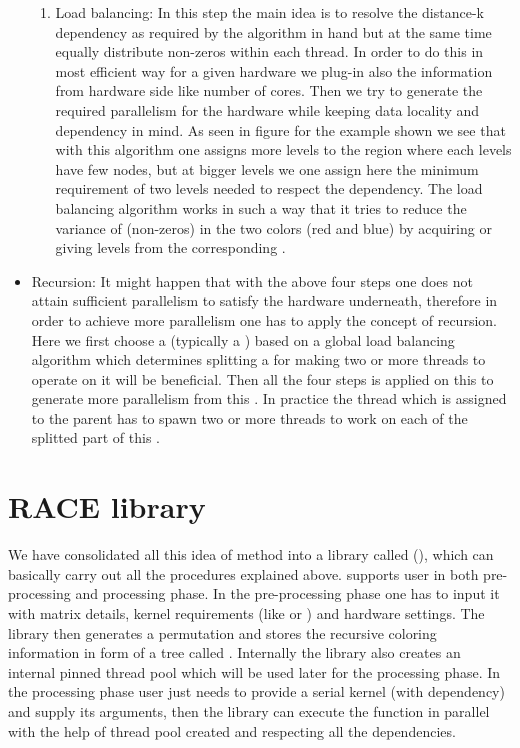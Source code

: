 \begin{itemize}
\begin{enumerate}
		\item Load balancing: In this step the main idea is to resolve the distance-k dependency as required by the algorithm in hand but at the same time equally distribute non-zeros within each thread. In order to do this in most efficient way for a given hardware we plug-in also the information from hardware side like number of cores. Then we try to generate the required parallelism for the hardware while keeping data locality and dependency in mind. As seen in figure for the example shown we see that with this algorithm one assigns more levels to the region where each levels have few nodes, but at bigger levels we one assign here the minimum requirement of two levels needed to respect the dependency. The load balancing algorithm works in such a way that it tries to reduce the variance of (non-zeros) \nnz in the two colors (red and blue) by acquiring or giving levels from the corresponding \levelGroup. 
		
		\end{enumerate}
		\item Recursion: It might happen that with the above four steps one does not attain sufficient parallelism to satisfy the hardware underneath, therefore in order to achieve more parallelism one has to apply the concept of recursion. Here we first choose a \subgraph (typically a \levelGroup) based on a global load balancing algorithm which determines splitting a \levelGroup for making two or more threads to operate on it will be beneficial. Then all the four steps is applied on this \subgraph to generate more parallelism from this \subgraph. In practice the thread which is assigned to the parent \subgraph has to spawn two or more threads to work on each of the splitted part of this \subgraph. 
\end{itemize}

\section{RACE library}
We have consolidated all this idea of \RAC method into a library called \RACEfull (\RACE), which can basically carry out all the procedures explained above. \RACE supports user in both pre-processing and processing phase. In the pre-processing phase one has to input it with matrix details, kernel requirements (like \DONE or \DTWO) and hardware settings. The library then generates a permutation and stores the recursive coloring information in form of a tree called \levelTree. Internally the library also creates an internal pinned thread pool which will be used later for the processing phase. In the processing phase user just needs to provide a serial kernel (with dependency) and supply its arguments, then the library can execute the function in parallel with the help of thread pool created and respecting all the dependencies.

